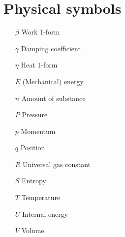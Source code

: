 \section*{Physical symbols}
\begin{itemize}[itemsep=0pt, leftmargin=2cm, labelsep=0cm, labelwidth=1.9cm, align=left]
    \item[$\beta$] Work 1-form
    \item[$\gamma$] Damping coefficient
    \item[$\eta$] Heat 1-form
%
    \item[$E$] (Mechanical) energy
    \item[$n$] Amount of substance
    \item[$P$] Pressure
    \item[$p$] Momentum
    \item[$q$] Position
    \item[$R$] Universal gas constant
    \item[$S$] Entropy
    \item[$T$] Temperature
    \item[$U$] Internal energy
    \item[$V$] Volume
%
%
%
\end{itemize}